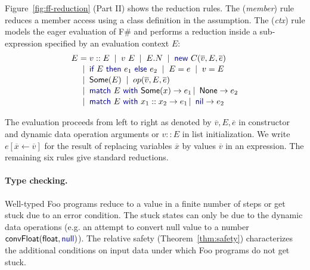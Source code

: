 \documentclass[pldi-cameraready]{sigplanconf-pldi16}
\newcommand{\kvd}[1]{\textnormal{\textcolor{kvdclr}{\sffamily #1}}}
\newcommand{\ident}[1]{\textnormal{\sffamily #1}}
\newcommand{\lsep}[0]{\;\; | \;\;}
\newcommand{\narrow}[1]{\hspace{-0.7em} #1 \hspace{-0.7em}}
\begin{document}
Figure~\ref{fig:ff-reduction} (Part II) shows the reduction rules.  The (\emph{member}) rule reduces
a member access using a class definition in the assumption. The (\emph{ctx}) rule models the eager
evaluation of F\# and performs a reduction inside a sub-expression specified by an evaluation
context $E$:
%
\begin{equation*}
\begin{array}{rcl}
 E &\narrow{=}& v::E \lsep v~E \lsep E.N \lsep \kvd{new}~C(\overline{v}, E, \overline{e})\\[0.1em]
   &\narrow{|}&  \kvd{if}~E~\kvd{then}~e_1~\kvd{else}~e_2  \lsep E = e \lsep v = E \\[0.1em]
   &\narrow{|}& \ident{Some}(E) \lsep op(\overline{v}, E, \overline{e})\\[0.1em]
   &\narrow{|}& \kvd{match}~E~\kvd{with}~\ident{Some}(x) \rightarrow e_1 \,|\, \ident{None} \rightarrow e_2 \\[0.1em]
   &\narrow{|}& \kvd{match}~E~\kvd{with}~x_1 :: x_2 \rightarrow e_1 \,|\, \kvd{nil} \rightarrow e_2
\end{array}
\end{equation*}

\noindent
The evaluation proceeds from left to right as denoted by $\overline{v}, E, \overline{e}$ in
constructor and dynamic data operation arguments or $v::E$ in list initialization.
We write $e[\overline{x} \leftarrow \overline{v}]$ for the result of replacing variables $\overline{x}$ by
values $\overline{v}$ in an expression. The remaining six rules
give standard reductions.


\paragraph{Type checking.}
Well-typed Foo programs reduce to a value in a finite number of steps or get stuck due to an
error condition. The stuck states can only be due to the dynamic data operations (e.g. an attempt
to convert \kvd{null} value to a number $\ident{convFloat}(\ident{float},\kvd{null})$). The relative safety (Theorem~\ref{thm:safety})
characterizes the additional conditions on input data under which Foo programs do not get stuck.
\end{document}

